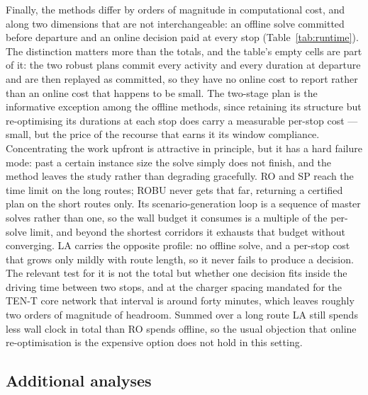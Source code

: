 Finally, the methods differ by orders of magnitude in computational cost, and along two dimensions that are not interchangeable: an offline solve committed before departure and an online decision paid at every stop (Table~\ref{tab:runtime}). The distinction matters more than the totals, and the table's empty cells are part of it: the two robust plans commit every activity and every duration at departure and are then replayed as committed, so they have no online cost to report rather than an online cost that happens to be small. The two-stage plan is the informative exception among the offline methods, since retaining its structure but re-optimising its durations at each stop does carry a measurable per-stop cost --- small, but the price of the recourse that earns it its window compliance. Concentrating the work upfront is attractive in principle, but it has a hard failure mode: past a certain instance size the solve simply does not finish, and the method leaves the study rather than degrading gracefully. RO and SP reach the time limit on the long routes; ROBU never gets that far, returning a certified plan on the short routes only. Its scenario-generation loop is a sequence of master solves rather than one, so the wall budget it consumes is a multiple of the per-solve limit, and beyond the shortest corridors it exhausts that budget without converging. LA carries the opposite profile: no offline solve, and a per-stop cost that grows only mildly with route length, so it never fails to produce a decision. The relevant test for it is not the total but whether one decision fits inside the driving time between two stops, and at the charger spacing mandated for the TEN-T core network that interval is around forty minutes, which leaves roughly two orders of magnitude of headroom. Summed over a long route LA still spends less wall clock in total than RO spends offline, so the usual objection that online re-optimisation is the expensive option does not hold in this setting.


\subsection{Additional analyses}
\label{sec:additional-protocol}

